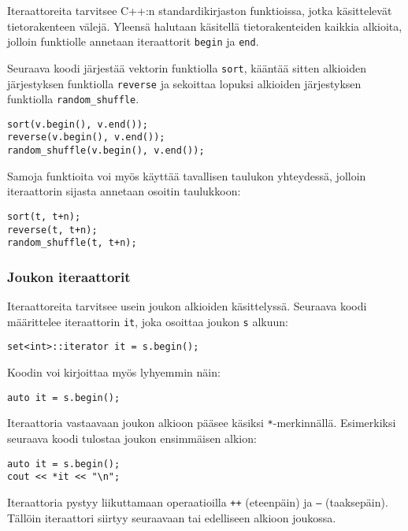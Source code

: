 Iteraattoreita tarvitsee
C++:n standardikirjaston funktioissa, jotka käsittelevät
tietorakenteen välejä.
Yleensä halutaan käsitellä tietorakenteiden kaikkia
alkioita, jolloin funktiolle annetaan
iteraattorit \texttt{begin} ja \texttt{end}.

Seuraava koodi järjestää vektorin funktiolla \texttt{sort},
kääntää sitten alkioiden järjestyksen funktiolla \texttt{reverse}
ja sekoittaa lopuksi alkioiden järjestyksen funktiolla \texttt{random\_shuffle}.


\begin{lstlisting}
sort(v.begin(), v.end());
reverse(v.begin(), v.end());
random_shuffle(v.begin(), v.end());
\end{lstlisting}

Samoja funktioita voi myös käyttää tavallisen taulukon
yhteydessä, jolloin iteraattorin sijasta annetaan
osoitin taulukkoon:

\begin{lstlisting}
sort(t, t+n);
reverse(t, t+n);
random_shuffle(t, t+n);
\end{lstlisting}

\subsubsection{Joukon iteraattorit}

Iteraattoreita tarvitsee usein joukon
alkioiden käsittelyssä.
Seuraava koodi määrittelee iteraattorin
\texttt{it}, joka osoittaa joukon \texttt{s} alkuun:

\begin{lstlisting}
set<int>::iterator it = s.begin();
\end{lstlisting}

Koodin voi kirjoittaa myös lyhyemmin näin:

\begin{lstlisting}
auto it = s.begin();
\end{lstlisting}
Iteraattoria vastaavaan joukon alkioon
pääsee käsiksi \texttt{*}-merkinnällä.
Esimerkiksi seuraava koodi tulostaa
joukon ensimmäisen alkion:

\begin{lstlisting}
auto it = s.begin();
cout << *it << "\n";
\end{lstlisting}
Iteraattoria pystyy liikuttamaan
operaatioilla \texttt{++} (eteenpäin)
ja \texttt{---} (taaksepäin).
Tällöin iteraattori siirtyy seuraavaan
tai edelliseen alkioon joukossa.

